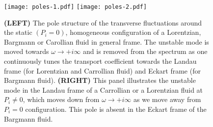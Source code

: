\documentclass[superscriptaddress,prd,nofootinbib,preprintnumbers,longbibliography,11pt,eqsecnum]{revtex4-1}
\begin{document}
\begin{figure}[b]
\centering
\texttt{[image: poles-1.pdf]}
\texttt{[image: poles-2.pdf]}
\captionsetup{justification=raggedright,
singlelinecheck=false
}
\caption{\textbf{(LEFT)} The pole structure of the transverse fluctuations around the static $(P_i =0)$, homogeneous configuration of a Lorentzian, Bargmann or Carollian fluid in general frame. The unstable mode is moved towards $\omega \to +i\infty$ and is removed from the spectrum as one continuously tunes the transport coefficient towards the Landau frame (for Lorentzian and Carrollian fluid) and Eckart frame (for Bargmann fluid). \textbf{(RIGHT)} This panel illustrates the unstable mode in the Landau frame of a Carrollian or a Lorentzian fluid at $P_i \ne 0$, which moves down from $\omega \to +i\infty$ as we move away from $P_i = 0$ configuration. This pole is absent in the Eckart frame of the Bargmann fluid. }
\label{fig:Poles}
\end{figure}
\end{document}
